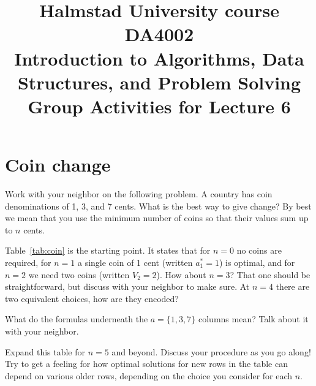 \documentclass[a4paper]{article}
\begin{document}
\title{
  {\small
    Halmstad University course DA4002\\
    Introduction to Algorithms, Data Structures, and Problem Solving\\
  }
  Group Activities for Lecture 6
}
\maketitle



\section{Coin change}

Work with your neighbor on the following problem.
A country has coin denominations of 1, 3, and 7 cents.
What is the best way to give change?
By best we mean that you use the minimum number of coins so that their values sum up to $n$ cents.

Table~\ref{tab:coin} is the starting point.
It states that for $n=0$ no coins are required, for $n=1$ a single coin of 1 cent (written $a^\ast_1=1$) is optimal, and for $n=2$ we need two coins (written $V_2=2$).
How about $n=3$?
That one should be straightforward, but discuss with your neighbor to make sure.
At $n=4$ there are two equivalent choices, how are they encoded?

What do the formulas underneath the $a=\{1,3,7\}$ columns mean?
Talk about it with your neighbor.

Expand this table for $n=5$ and beyond.
Discuss your procedure as you go along!
Try to get a feeling for how optimal solutions for new rows in the table can depend on various older rows, depending on the choice you consider for each $n$.\\[3\baselineskip]
\end{document}
